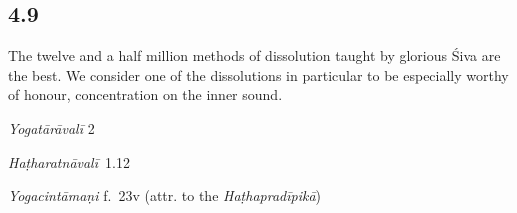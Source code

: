 \begin{ekdosis}




\subsection*{4.9}
\begin{translation}[hp04_009]
The twelve and a half million methods of dissolution taught by glorious Śiva are the best. We consider one of the dissolutions in particular to be especially worthy of honour, concentration on the inner sound.
\end{translation}

\begin{sources}[hp04_009]
\emph{Yogatārāvalī} 2
\begin{versinnote}
\end{versinnote}
\end{sources}

\begin{testimonia}[hp04_009]
\emph{Haṭharatnāvalī}~1.12
\begin{versinnote}
\end{versinnote}

\emph{Yogacintāmaṇi} f.~23v (attr. to the \emph{Haṭhapradīpikā})
\begin{versinnote}
\end{versinnote}


\end{testimonia}
\end{ekdosis}
